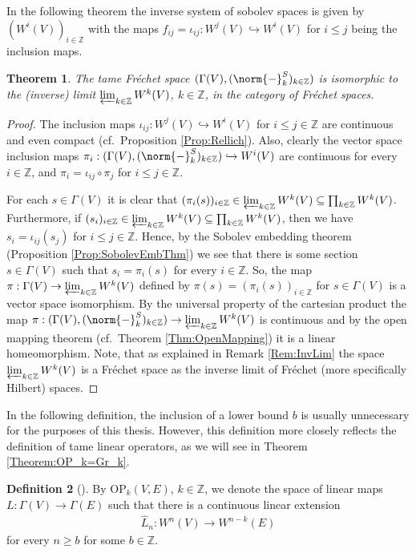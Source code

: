 \documentclass[12pt,a4paper]{article}
\theoremstyle{plain}
\newtheorem{theorem}{Theorem}[subsection]
\theoremstyle{definition}
\newtheorem{definition}[theorem]{Definition}
\newcommand{\nnorm}[2]{\norm{#1}_{#2}}
\newcommand{\OP}{\mathrm{OP}}
\begin{document}
In the following theorem the inverse system of sobolev spaces is given by $(W^i(V))_{i\in \mathbb Z}$ with the maps $f_{ij}=\iota_{ij}:W^j(V)\hookrightarrow W^i(V)$ for $i\leq j$ being the inclusion maps.
\begin{theorem}
\label{VBsectInvLimW^k}
The tame Fréchet space $(\Gamma(V),(\nnorm{-}{k}^S)_{k\in \mathbb{Z}})$ is isomorphic to the (inverse) limit $\varprojlim_{k\in \mathbb Z} W^k(V)$, $k\in \mathbb Z$, in the category of Fréchet spaces.   
\end{theorem}
\begin{proof}
The inclusion maps $\iota_{ij}:W^j(V)\hookrightarrow W^i(V)$ for $i\leq j\in \mathbb Z$ are continuous and even compact (cf.~Proposition \ref{Prop:Rellich}). Also, clearly the vector space inclusion maps $\pi_i:(\Gamma(V),(\nnorm{-}{k}^S)_{k\in \mathbb{Z}})\hookrightarrow W^i(V)$ are continuous for every $i\in \mathbb Z$, and $\pi_i=\iota_{ij}\circ \pi_j$ for $i\leq j\in \mathbb Z$.

For each $s\in \Gamma(V)$ it is clear that $(\pi_i(s))_{i\in \mathbb Z}\in \varprojlim_{k\in \mathbb Z} W^k(V)\subseteq \prod_{k\in \mathbb Z}W^k(V)$.
Furthermore, if $(s_i)_{i\in \mathbb Z}\in \varprojlim_{k\in \mathbb Z} W^k(V)\subseteq \prod_{k\in \mathbb Z}W^k(V)$, then we have $s_i=\iota_{ij}(s_j)$ for $i\leq j\in \mathbb Z$. Hence, by the Sobolev embedding theorem (Proposition \ref{Prop:SobolevEmbThm}) we see that there is some section $s\in\Gamma(V)$ such that $s_i=\pi_i(s)$ for every $i\in \mathbb Z$. So, the map 
$\pi:\Gamma(V)\to \varprojlim_{k\in \mathbb Z} W^k(V)$ defined by $\pi(s)=(\pi_i(s))_{i\in \mathbb Z}$ for $s\in \Gamma(V)$ is a vector space isomorphism.
By the universal property of the cartesian product the map
$\pi:(\Gamma(V),(\nnorm{-}{k}^S)_{k\in \mathbb{Z}})\to \varprojlim_{k\in \mathbb Z} W^k(V)$ is continuous and by the open mapping theorem (cf.~Theorem \ref{Thm:OpenMapping}) it is a linear homeomorphism. Note, that as explained in Remark \ref{Rem:InvLim} the space $\varprojlim_{k\in \mathbb Z} W^k(V)$ is a Fréchet space as the inverse limit of Fréchet (more specifically Hilbert) spaces.
\end{proof}

In the following definition, the inclusion of a lower bound $b$ is usually unnecessary for the purposes of this thesis. However, this definition more closely reflects the definition of tame linear operators, as we will see in Theorem \ref{Theorem:OP_k=Gr_k}.
\begin{definition}[{\cite[p.~114]{Wells07}}]
By $\OP_k(V,E)$, $k\in \mathbb Z$, we denote the space of linear maps $L:\Gamma(V)\to \Gamma(E)$ such that there is a continuous linear extension
\begin{align*}
    \hat{L}_n:W^n(V)\to W^{n-k}(E)
\end{align*}
for every $n\geq b$ for some $b\in \mathbb Z$.
\end{definition}
\end{document}

